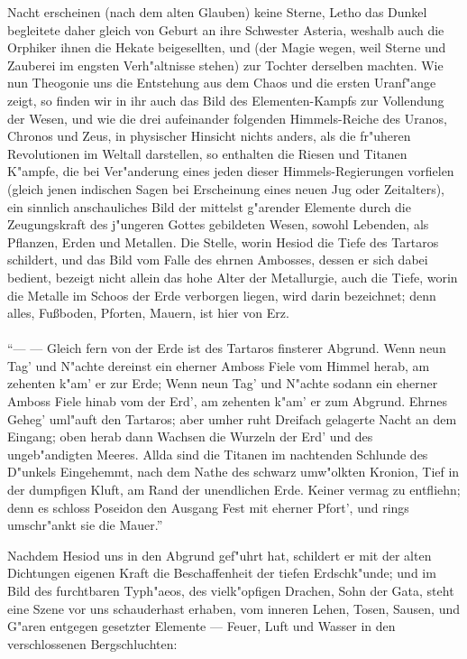 \documentclass[a4paper, 11pt, oneside, polutonikogreek, german]{article}
\begin{document}
\begin{enumerate}
Nacht erscheinen (nach dem alten Glauben) keine Sterne, Letho das Dunkel begleitete daher gleich von Geburt an ihre Schwester Asteria, weshalb auch die Orphiker ihnen die Hekate beigesellten, und (der Magie wegen, weil Sterne und Zauberei im engsten Verh"altnisse stehen) zur Tochter derselben machten. Wie nun Theogonie uns die Entstehung aus dem Chaos und die ersten Uranf"ange zeigt, so finden wir in ihr auch das Bild des Elementen-Kampfs zur Vollendung der Wesen, und wie die drei aufeinander folgenden Himmels-Reiche des Uranos, Chronos und Zeus, in physischer Hinsicht nichts anders, als die fr"uheren Revolutionen im Weltall darstellen, so enthalten die Riesen und Titanen K"ampfe, die bei Ver"anderung eines jeden dieser Himmels-Regierungen vorfielen (gleich jenen indischen Sagen bei Erscheinung eines neuen Jug oder Zeitalters), ein sinnlich anschauliches Bild der mittelst g"arender Elemente durch die Zeugungskraft des j"ungeren Gottes gebildeten Wesen, sowohl Lebenden, als Pflanzen, Erden und Metallen. Die Stelle, worin Hesiod die Tiefe des Tartaros schildert, und das Bild vom Falle des ehrnen Ambosses, dessen er sich dabei bedient, bezeigt nicht allein das hohe Alter der Metallurgie, auch die Tiefe, worin die Metalle im Schoos der Erde verborgen liegen, wird darin bezeichnet; denn alles, Fußboden, Pforten, Mauern, ist hier von Erz.
\end{enumerate}
\paragraph{}
"`--- --- Gleich fern von der Erde ist des Tartaros finsterer Abgrund. Wenn neun Tag' und N"achte dereinst ein eherner Amboss Fiele vom Himmel herab, am zehenten k"am' er zur Erde; Wenn neun Tag' und N"achte sodann ein eherner Amboss Fiele hinab vom der Erd', am zehenten k"am' er zum Abgrund. Ehrnes Geheg' uml"auft den Tartaros; aber umher ruht Dreifach gelagerte Nacht an dem Eingang; oben herab dann Wachsen die Wurzeln der Erd' und des ungeb"andigten Meeres. Allda sind die Titanen im nachtenden Schlunde des D"unkels Eingehemmt, nach dem Nathe des schwarz umw"olkten Kronion, Tief in der dumpfigen Kluft, am Rand der unendlichen Erde. Keiner vermag zu entfliehn; denn es schloss Poseidon den Ausgang Fest mit eherner Pfort', und rings umschr"ankt sie die Mauer."'

Nachdem Hesiod uns in den Abgrund gef"uhrt hat, schildert er mit der alten Dichtungen eigenen Kraft die Beschaffenheit der tiefen Erdschk"unde; und im Bild des furchtbaren Typh"aeos, des vielk"opfigen Drachen, Sohn der Gata, steht eine Szene vor uns schauderhast erhaben, vom inneren Lehen, Tosen, Sausen, und G"aren entgegen gesetzter Elemente --- Feuer, Luft und Wasser in den verschlossenen Bergschluchten:
\end{document}
